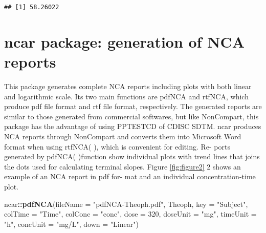 \documentclass[12pt,]{krantz}
\newenvironment{Shaded}{\begin{snugshade}}{\end{snugshade}}
\newcommand{\DataTypeTok}[1]{\textcolor[rgb]{0.13,0.29,0.53}{#1}}
\newcommand{\DecValTok}[1]{\textcolor[rgb]{0.00,0.00,0.81}{#1}}
\newcommand{\FloatTok}[1]{\textcolor[rgb]{0.00,0.00,0.81}{#1}}
\newcommand{\KeywordTok}[1]{\textcolor[rgb]{0.13,0.29,0.53}{\textbf{#1}}}
\newcommand{\NormalTok}[1]{#1}
\newcommand{\OperatorTok}[1]{\textcolor[rgb]{0.81,0.36,0.00}{\textbf{#1}}}
\newcommand{\StringTok}[1]{\textcolor[rgb]{0.31,0.60,0.02}{#1}}
\theoremstyle{definition}
\theoremstyle{definition}
\theoremstyle{definition}
\theoremstyle{remark}
\begin{document}
\begin{Shaded}
\end{Shaded}

\begin{verbatim}
## [1] 58.26022
\end{verbatim}

\hypertarget{ncar-package-generation-of-nca-reports}{%
\section{ncar package: generation of NCA
reports}\label{ncar-package-generation-of-nca-reports}}

This package generates complete NCA reports including plots with both
linear and logarithmic scale. Its two main functions are pdfNCA and
rtfNCA, which produce pdf file format and rtf file format, respectively.
The generated reports are similar to those generated from commercial
softwares, but like NonCompart, this package has the advantage of using
PPTESTCD of CDISC SDTM. ncar produces NCA reports through NonCompart and
converts them into Microsoft Word format when using rtfNCA( ), which is
convenient for editing. Re- ports generated by pdfNCA( )function show
individual plots with trend lines that joins the dots used for
calculating terminal slopes. Figure \ref{fig:figure2} 2 shows an example
of an NCA report in pdf for- mat and an individual concentration-time
plot.

\begin{Shaded}
\begin{Highlighting}[]
\NormalTok{ncar}\OperatorTok{::}\KeywordTok{pdfNCA}\NormalTok{(}\DataTypeTok{fileName =} \StringTok{"pdfNCA-Theoph.pdf"}\NormalTok{, Theoph, }\DataTypeTok{key =} \StringTok{"Subject"}\NormalTok{, }
       \DataTypeTok{colTime =} \StringTok{"Time"}\NormalTok{, }\DataTypeTok{colConc =} \StringTok{"conc"}\NormalTok{, }\DataTypeTok{dose =} \DecValTok{320}\NormalTok{, }\DataTypeTok{doseUnit =} \StringTok{"mg"}\NormalTok{, }
       \DataTypeTok{timeUnit =} \StringTok{"h"}\NormalTok{, }\DataTypeTok{concUnit =} \StringTok{"mg/L"}\NormalTok{, }\DataTypeTok{down =} \StringTok{"Linear"}\NormalTok{)}
\end{Highlighting}
\end{Shaded}
\end{document}
